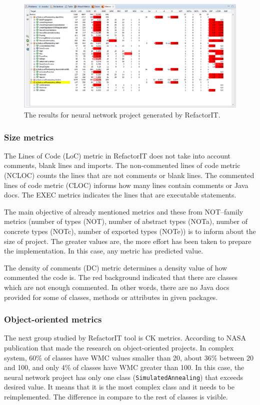 \begin{figure}[h!]
	\centering
	\includegraphics[scale=0.45]{img/wyniki-refactorIT.png} 
	\caption{The results for neural network project generated by RefactorIT.}		
	\label{fig:wyniki}
\end{figure}

\subsubsection*{Size metrics}
The Lines of Code (\ac{LoC}) metric in RefactorIT does not take into account comments, blank lines and imports. The non-commented lines of code metric (\ac{NCLOC}) counts the lines that are not comments or blank lines. The commented lines of code metric (\ac{CLOC}) informs how many lines contain comments or Java docs. The \ac{EXEC} metrics indicates the lines that are executable statements. 

The main objective of already mentioned metrics and these from NOT--family metrics (number of types (\ac{NOT}), number of abstract types (\ac{NOTa}), number of concrete types (\ac{NOTc}), number of exported types (\ac{NOTe})) is to inform about the size of project. The greater values are, the more effort has been taken to prepare the implementation. In this case, any metric has predicted value.

The density of comments (\ac{DC}) metric determines a density value of how commented the code is. The red background indicated that there are classes which are not enough commented. In other words, there are no Java docs provided for some of classes, methods or attributes in given packages.

\subsubsection*{Object-oriented metrics}
The next group studied by RefactorIT tool is \ac{CK metrics}. According to NASA publication \cite{nasa} that made the research on object-oriented projects. In complex system, 60\% of classes have \ac{WMC} values smaller than 20, about 36\% between 20 and 100, and only 4\% of classes have \ac{WMC} greater than 100. In this case, the neural network project has only one class (\texttt{SimulatedAnnealing}) that exceeds desired value. It means that it is the most complex class and it needs to be reimplemented. The difference in compare to the rest of classes is visible. 


